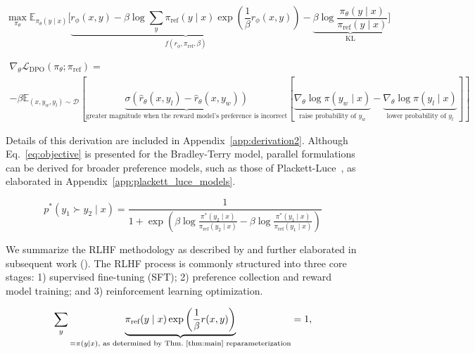 \begin{equation}\label{eq:AC}
    \max_{\pi_{\theta}}\mathbb{E}_{\pi_{\theta}(y\mid x)}\bigg[\underbrace{r_{\phi}(x, y) -\beta\log\sum_{y}\pi_\text{ref}(y\mid x)\exp\left(\frac{1}{\beta}r_{\phi}(x, y)\right)}_{f(r_{\phi}, \pi_\text{ref}, \beta)} - \underbrace{\beta\log\frac{\pi_{\theta}(y\mid x)}{\pi_\text{ref}(y\mid x)}}_{\text{KL}}\bigg]
\end{equation}

\begin{multline*}\label{eq:gradient}
    \nabla_\theta \mathcal{L}_\text{DPO}(\pi_\theta;\pi_\text{ref}) = \\ -\beta\mathbb{E}_{(x, y_w, y_l) \sim \mathcal{D}} \left[\underbrace{\sigma(\hat{r}_\theta(x, y_l) - \hat{r}_\theta (x, y_w))}_\text{greater magnitude when the reward model's preference is incorrect}\left[\underbrace{\nabla_\theta\log \pi(y_w \mid x)}_\text{raise probability of $y_w$} - \underbrace{\nabla_\theta\log\pi(y_l \mid x)}_\text{lower probability of $y_l$}\right]\right],
\end{multline*}

Details of this derivation are included in Appendix~\ref{app:derivation2}. Although Eq.~\ref{eq:objective} is presented for the Bradley-Terry model, parallel formulations can be derived for broader preference models, such as those of Plackett-Luce~\citep{plackett1975analysis, luce2012individual}, as elaborated in Appendix~\ref{app:plackett_luce_models}.

\begin{equation}\label{eq:objective}
    p^*(y_1\succ y_2 \mid x)=\frac{1}{1 + \exp\left(\beta \log \frac{\pi^*(y_2\mid x)}{\pi_\text{ref}(y_2\mid x)} - \beta \log \frac{\pi^*(y_1\mid x)}{\pi_\text{ref}(y_1\mid x)}\right)}
\end{equation}

We summarize the RLHF methodology as described by \citeauthor{ziegler2020finetuning} and further elaborated in subsequent work (\citep{stiennon2022learning, bai2022training, ouyang2022training}). The RLHF process is commonly structured into three core stages: 1) supervised fine-tuning (SFT); 2) preference collection and reward model training; and 3) reinforcement learning optimization.

\begin{equation}\label{eq:lag_p}
     \sum_{y}\underbrace{\pi_\text{ref}(y\mid x)\exp\left(\frac{1}{\beta}r(x, y)\right)}_{=\pi(y\mid x)\text{, as determined by Thm.~\ref{thm:main} reparameterization}} = 1,
\end{equation}

